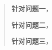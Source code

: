 \maketitle%
\begin{abstract}%


	
	
	
	\textbf{针对问题一}，	%
	
	
	
	
	\textbf{针对问题二}，%
	
	
	
	\textbf{针对问题三}，%
	
	
	
	
	
	
	
	
	
\end{abstract}

